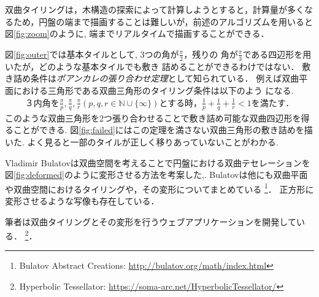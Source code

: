 双曲タイリングは，木構造の探索によって計算しようとすると，計算量が多くな
るため，円盤の端まで描画することは難しいが，前述のアルゴリズムを用いると
図\ref{fig:zoom}のように, 端までリアルタイムで描画することができる．

図\ref{fig:outer}では基本タイルとして, 3つの角が$\frac{\pi}{2}$，残りの
角が$\frac{\pi}{3}$である四辺形を用いたが，どのような基本タイルでも敷き
詰めることができるわけではない．
敷き詰め条件は\emph{ポアンカレの張り合わせ定理}として知られている．
例えば双曲平面における三角形である双曲三角形のタイリング条件は以下のよう
になる.
\begin{eqnarray*}
\text{３内角を}\frac{\pi}{p},\frac{\pi}{q},\frac{\pi}{r} (p, q, r \in
 \mathbb{N} \cup \{\infty\}) \text{とする時，}
 \frac{1}{p} + \frac{1}{q} + \frac{1}{r} < 1 \text{を満たす．}
\end{eqnarray*}
このような双曲三角形を2つ張り合わせることで敷き詰め可能な双曲四辺形を得
ることができる.
図\ref{fig:failed}にはこの定理を満さない双曲三角形の敷き詰めを描いた.
よく見ると一部のタイルが正しく移りあっていないことがわかる.

Vladimir Bulatovは双曲空間を考えることで円盤における双曲テセレーションを
図\ref{fig:deformed}のように変形させる方法を考案した\cite{bridges2013:167},\cite{bridges2011:479}.
Bulatovは他にも双曲平面や双曲空間におけるタイリングや，その変形についてまとめている
\footnote{Bulatov Abstract Creations: \url{http://bulatov.org/math/index.html}}．
正方形に変形させるような写像も存在している\cite{bridges2016:179}．

筆者は双曲タイリングとその変形を行うウェブアプリケーションを開発している．
\footnote{Hyperbolic Tessellator: \url{https://soma-arc.net/HyperbolicTessellator/}}．

